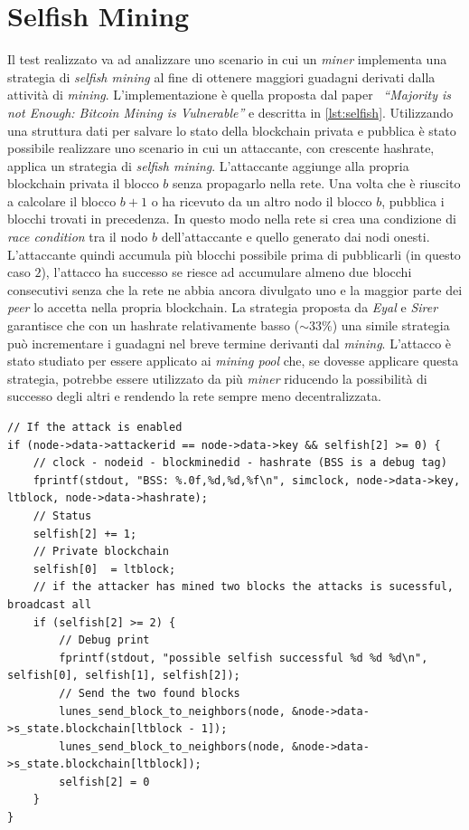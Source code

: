 \section{Selfish Mining}
Il test realizzato va ad analizzare uno scenario in cui un \textit{miner} implementa una strategia di \textit{selfish mining} al fine di ottenere maggiori guadagni derivati dalla attività di \textit{mining}.\newline
L'implementazione è quella proposta dal paper~\cite{selfish} \textit{``Majority is not Enough: Bitcoin Mining is Vulnerable''} e descritta in \ref{lst:selfish}. Utilizzando una struttura dati per salvare lo stato della blockchain privata e pubblica è stato possibile realizzare uno scenario in cui un attaccante, con crescente hashrate, applica un strategia di \textit{selfish mining}.\newline
L'attaccante aggiunge alla propria blockchain privata il blocco $b$ senza propagarlo nella rete. Una volta che è riuscito a calcolare il blocco $b+1$ o ha ricevuto da un altro nodo il blocco $b$, pubblica i blocchi trovati in precedenza. In questo modo nella rete si crea una condizione di \textit{race condition} tra il nodo $b$ dell'attaccante e quello generato dai nodi onesti.\newline
L'attaccante quindi accumula più blocchi possibile prima di pubblicarli (in questo caso $2$), l'attacco ha successo se riesce ad accumulare almeno due blocchi consecutivi senza che la rete ne abbia ancora divulgato uno e la maggior parte dei \textit{peer} lo accetta nella propria blockchain.\newline
La strategia proposta da \textit{Eyal} e \textit{Sirer}~\cite{selfish} garantisce che con un hashrate relativamente basso ($\sim33\%$) una simile strategia può incrementare i guadagni nel breve termine derivanti dal \textit{mining}. L'attacco è stato studiato per essere applicato ai \textit{mining pool} che, se dovesse applicare questa strategia, potrebbe essere utilizzato da più \textit{miner} riducendo la possibilità di successo degli altri e rendendo la rete sempre meno decentralizzata.
\clearpage
\begin{code}
\begin{verbatim}
// If the attack is enabled
if (node->data->attackerid == node->data->key && selfish[2] >= 0) {
    // clock - nodeid - blockminedid - hashrate (BSS is a debug tag)
    fprintf(stdout, "BSS: %.0f,%d,%d,%f\n", simclock, node->data->key, ltblock, node->data->hashrate);
    // Status
    selfish[2] += 1;
    // Private blockchain
    selfish[0]  = ltblock;
    // if the attacker has mined two blocks the attacks is sucessful, broadcast all
    if (selfish[2] >= 2) {
        // Debug print
        fprintf(stdout, "possible selfish successful %d %d %d\n", selfish[0], selfish[1], selfish[2]);
        // Send the two found blocks
        lunes_send_block_to_neighbors(node, &node->data->s_state.blockchain[ltblock - 1]);
        lunes_send_block_to_neighbors(node, &node->data->s_state.blockchain[ltblock]);
        selfish[2] = 0
    }
}
\end{verbatim}
\end{code}
